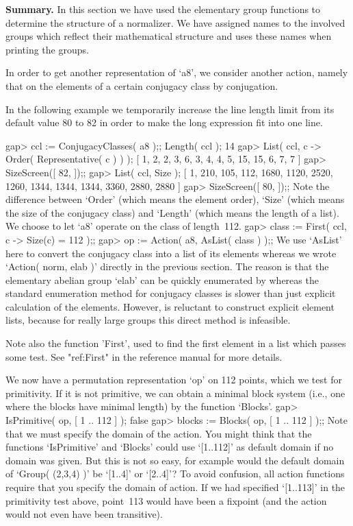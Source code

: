 {\bf Summary.}   In  this section   we have   used   the elementary group
functions to determine  the structure of  a normalizer. We have  assigned
names  to the involved groups which  reflect their mathematical structure
and {\GAP} uses these names when printing the groups.


In  order to get  another  representation  of  `a8', we consider  another
action, namely  that on  the elements   of a  certain conjugacy  class by
conjugation.

In the following example we temporarily increase the line length limit
from its default value 80 to 82 in order to make the long expression fit
into one line.

\beginexample
gap> ccl := ConjugacyClasses( a8 );; Length( ccl );
14
gap> List( ccl, c -> Order( Representative( c ) ) );
[ 1, 2, 2, 3, 6, 3, 4, 4, 5, 15, 15, 6, 7, 7 ]
gap> SizeScreen([ 82, ]);;
gap> List( ccl, Size );
[ 1, 210, 105, 112, 1680, 1120, 2520, 1260, 1344, 1344, 1344, 3360, 2880, 2880 ]
gap> SizeScreen([ 80, ]);;
\endexample
Note  the  difference between `Order'  (which   means the element order),
`Size' (which means the size of the conjugacy  class) and `Length' (which
means the length of  a list). We choose to  let `a8' operate on the class
of length~112.
\beginexample
gap> class := First( ccl, c -> Size(c) = 112 );;
gap> op := Action( a8, AsList( class ) );;
\endexample
We use `AsList' here  to convert the conjugacy class  into a list  of its
elements whereas we   wrote  `Action( norm,  elab )'   directly in the
previous section. The reason is that  the elementary abelian group `elab'
can  be quickly enumerated by   {\GAP}  whereas the standard  enumeration
method for conjugacy classes is  slower than just explicit calculation of
the elements. However, {\GAP} is reluctant  to construct explicit element
lists, because for really large groups this direct method is infeasible.

Note also  the function 'First', used to  find the  first element in a
list which  passes some test. See  "ref:First" in the reference manual
for more details.

We now have a permutation representation `op' on 112 points, which we
test for primitivity. If it is not primitive, we can obtain a minimal
block system (i.e., one where the blocks have minimal length) by the
function `Blocks'.
\beginexample
gap> IsPrimitive( op, [ 1 .. 112 ] );
false
gap> blocks := Blocks( op, [ 1 .. 112 ] );;
\endexample
Note that we  must specify the domain  of the action. You  might think
that the   functions `IsPrimitive' and `Blocks'  could  use `[1..112]' as
default  domain if no  domain was  given. But  this  is not so  easy, for
example  would the default domain  of `Group(  (2,3,4)  )' be `[1..4]' or
`[2..4]'? To  avoid confusion, all action  functions  require that you
specify  the domain of action. If  we had specified  `[1..113]' in the
primitivity test above,  point~113  would have been  a fixpoint  (and the
action would not even have been transitive).

